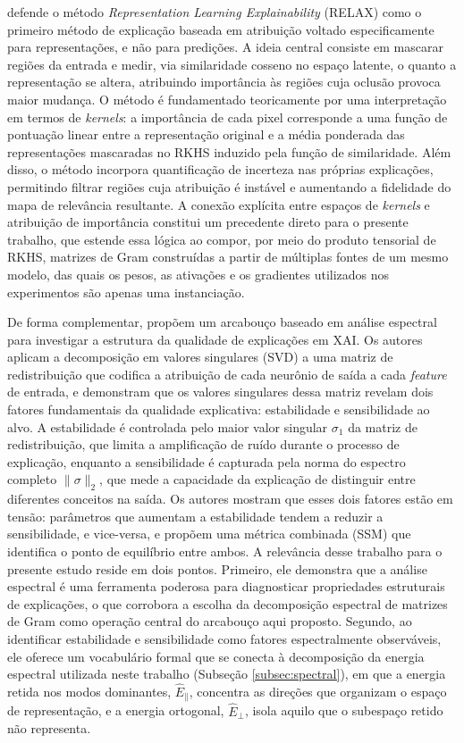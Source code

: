 \cite{Wickstrom2023} defende o método \textit{Representation Learning Explainability} (RELAX) como o primeiro método de explicação baseada em atribuição voltado especificamente para representações, e não para predições. A ideia central consiste em mascarar regiões da entrada e medir, via similaridade cosseno no espaço latente, o quanto a representação se altera, atribuindo importância às regiões cuja oclusão provoca maior mudança. O método é fundamentado teoricamente por uma interpretação em termos de \textit{kernels}: a importância de cada pixel corresponde a uma função de pontuação linear entre a representação original e a média ponderada das representações mascaradas no RKHS induzido pela função de similaridade. Além disso, o método incorpora quantificação de incerteza nas próprias explicações, permitindo filtrar regiões cuja atribuição é instável e aumentando a fidelidade do mapa de relevância resultante. A conexão explícita entre espaços de \textit{kernels} e atribuição de importância constitui um precedente direto para o presente trabalho, que estende essa lógica ao compor, por meio do produto tensorial de RKHS, matrizes de Gram construídas a partir de múltiplas fontes de um mesmo modelo, das quais os pesos, as ativações e os gradientes utilizados nos experimentos são apenas uma instanciação.

De forma complementar, \cite{Mae2026} propõem um arcabouço baseado em análise espectral para investigar a estrutura da qualidade de explicações em XAI. Os autores aplicam a decomposição em valores singulares (SVD) a uma matriz de redistribuição que codifica a atribuição de cada neurônio de saída a cada \textit{feature} de entrada, e demonstram que os valores singulares dessa matriz revelam dois fatores fundamentais da qualidade explicativa: estabilidade e sensibilidade ao alvo. A estabilidade é controlada pelo maior valor singular \(\sigma_1\) da matriz de redistribuição, que limita a amplificação de ruído durante o processo de explicação, enquanto a sensibilidade é capturada pela norma do espectro completo \(\|\sigma\|_2\), que mede a capacidade da explicação de distinguir entre diferentes conceitos na saída. Os autores mostram que esses dois fatores estão em tensão: parâmetros que aumentam a estabilidade tendem a reduzir a sensibilidade, e vice-versa, e propõem uma métrica combinada (SSM) que identifica o ponto de equilíbrio entre ambos. A relevância desse trabalho para o presente estudo reside em dois pontos. Primeiro, ele demonstra que a análise espectral é uma ferramenta poderosa para diagnosticar propriedades estruturais de explicações, o que corrobora a escolha da decomposição espectral de matrizes de Gram como operação central do arcabouço aqui proposto. Segundo, ao identificar estabilidade e sensibilidade como fatores espectralmente observáveis, ele oferece um vocabulário formal que se conecta à decomposição da energia espectral utilizada neste trabalho (Subseção \ref{subsec:spectral}), em que a energia retida nos modos dominantes, \(\widehat{E}_{\parallel}\), concentra as direções que organizam o espaço de representação, e a energia ortogonal, \(\widehat{E}_{\perp}\), isola aquilo que o subespaço retido não representa.

